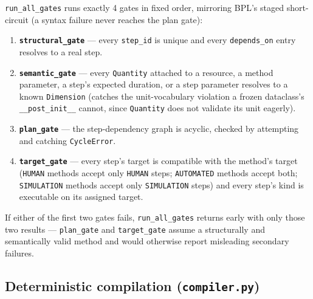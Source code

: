\documentclass[
  english,
]{article}
\providecommand{\tightlist}{%
  \setlength{\itemsep}{0pt}\setlength{\parskip}{0pt}}
\begin{document}
\texttt{run\_all\_gates} runs exactly 4 gates in fixed order, mirroring
BPL's staged short-circuit (a syntax failure never reaches the plan
gate):

\begin{enumerate}
\def\labelenumi{\arabic{enumi}.}
\tightlist
\item
  \textbf{\texttt{structural\_gate}} --- every \texttt{step\_id} is
  unique and every \texttt{depends\_on} entry resolves to a real step.
\item
  \textbf{\texttt{semantic\_gate}} --- every \texttt{Quantity} attached
  to a resource, a method parameter, a step's expected duration, or a
  step parameter resolves to a known \texttt{Dimension} (catches the
  unit-vocabulary violation a frozen dataclass's
  \texttt{\_\_post\_init\_\_} cannot, since \texttt{Quantity} does not
  validate its unit eagerly).
\item
  \textbf{\texttt{plan\_gate}} --- the step-dependency graph is acyclic,
  checked by attempting  and catching
  \texttt{CycleError}.
\item
  \textbf{\texttt{target\_gate}} --- every step's target is compatible
  with the method's target (\texttt{HUMAN} methods accept only
  \texttt{HUMAN} steps; \texttt{AUTOMATED} methods accept both;
  \texttt{SIMULATION} methods accept only \texttt{SIMULATION} steps) and
  every step's kind is executable on its assigned target.
\end{enumerate}

If either of the first two gates fails, \texttt{run\_all\_gates} returns
early with only those two results --- \texttt{plan\_gate} and
\texttt{target\_gate} assume a structurally and semantically valid
method and would otherwise report misleading secondary failures.

\subsection{\texorpdfstring{Deterministic compilation
(\texttt{compiler.py})}{Deterministic compilation (compiler.py)}}\label{deterministic-compilation-compiler.py}
\end{document}
